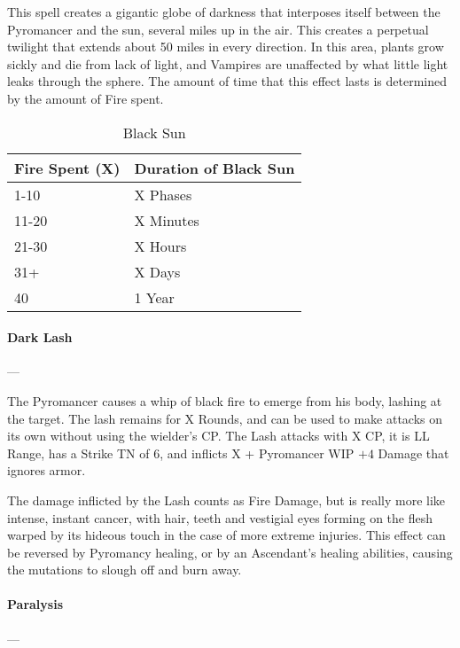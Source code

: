 \documentclass[oneside,11pt,english]{book}
\begin{document}
This spell creates a gigantic globe of darkness that interposes itself between
the Pyromancer and the sun, several miles up in the air. This creates a
perpetual twilight that extends about 50 miles in every direction. In this area,
plants grow sickly and die from lack of light, and Vampires are unaffected by
what little light leaks through the sphere. The amount of time that this effect
lasts is determined by the amount of Fire spent.

\begin{table}[ht]
  \centering
  \caption{Black Sun}
  \label{tab:Black Sun}
  \begin{tabu} spread 5pt {X[-1]X[-1]}
    Fire Spent (X) & Duration of Black Sun \\ -10           & X Phases              \\
    11-20          & X Minutes             \\
    21-30          & X Hours               \\
    31+            & X Days                \\
    40             & 1 Year                \\
  \end{tabu}
\end{table}

\paragraph{Dark Lash}
---\quad [4+X]

The Pyromancer causes a whip of black fire to emerge from his body, lashing at
the target. The lash remains for X Rounds, and can be used to make attacks on
its own without using the wielder’s CP. The Lash attacks with X CP, it is LL
Range, has a Strike TN of 6, and inflicts X + Pyromancer WIP $+ 4$ Damage that
ignores armor.

The damage inflicted by the Lash counts as Fire Damage, but is really more like
intense, instant cancer, with hair, teeth and vestigial eyes forming on the
flesh warped by its hideous touch in the case of more extreme injuries. This
effect can be reversed by Pyromancy healing, or by an Ascendant’s healing
abilities, causing the mutations to slough off and burn away.

\paragraph{Paralysis}
---\quad  [X]
\end{document}
